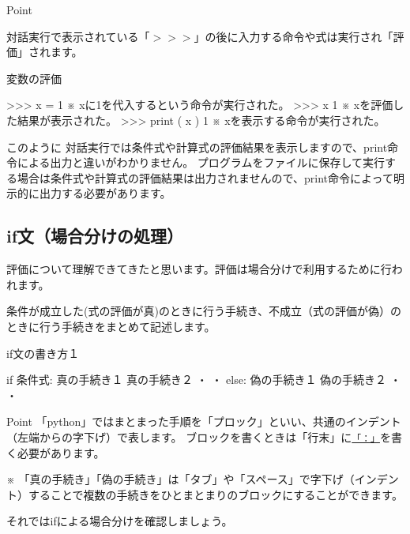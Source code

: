 \documentclass[11pt,a4paper,dvipdfmx,titlepage]{jsreport}
\begin{document}
\begin{hipoint}{Point}

 {\gt 対話実行}で表示されている「$>>>$」の後に入力する命令や式は実行され「評価」されます。
\end{hipoint}

\begin{grabox}{変数の評価}
\begin{listing}{1}
>>> x = 1
※ xに1を代入するという命令が実行された。
>>> x
1
※ xを評価した結果が表示された。
>>> print ( x )
1
※ xを表示する命令が実行された。
\end{listing}
\end{grabox}

このように {\gt 対話実行}では条件式や計算式の評価結果を表示しますので、print命令による出力と違いがわかりません。
プログラムをファイルに保存して実行する場合は条件式や計算式の評価結果は出力されませんので、print命令によって明示的に出力する必要があります。

\subsection{if文（場合分けの処理）}

評価について理解できてきたと思います。評価は場合分けで利用するために行われます。

条件が成立した(式の評価が真)のときに行う手続き、不成立（式の評価が偽）のときに行う手続きをまとめて記述します。


\begin{grabox}{if文の書き方１}
\begin{listing}{1}
if 条件式:
    真の手続き１
    真の手続き２
    ・
    ・
else:
    偽の手続き１
    偽の手続き２
    ・
    ・
\end{listing}
\end{grabox}
\begin{hipoint}{Point}
「python」ではまとまった手順を「プロック」といい、共通のインデント（左端からの字下げ）で表します。
ブロックを書くときは「行末」に{\underline{\tt 「：」}}を書く必要があります。

※ 「真の手続き」「偽の手続き」は「タブ」や「スペース」で字下げ（インデント）することで複数の手続きをひとまとまりのブロックにすることができます。
\end{hipoint}

それではifによる場合分けを確認しましょう。
\end{document}
